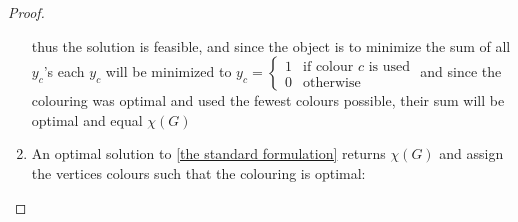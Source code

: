 \begin{proposition}
\begin{proof}
\begin{enumerate}
\begin{enumerate}
\end{enumerate}
thus the solution is feasible, and since the object is to minimize the sum of all $y_c$'s each $y_c$ will be minimized to 
$y_c =\left\{
\begin{array}{ll}
1 & \text{if colour }c \text{ is used} \\ 0 & \text{otherwise}
\end{array}\right. $ and since the colouring was optimal and used the fewest colours possible, their sum will be optimal and equal $\chi(G)$ 
\item An optimal solution to \ref{the standard formulation} returns $\chi(G)$ and assign the vertices colours such that the colouring is optimal:\\

\end{enumerate}
\end{proof}
\end{proposition}

